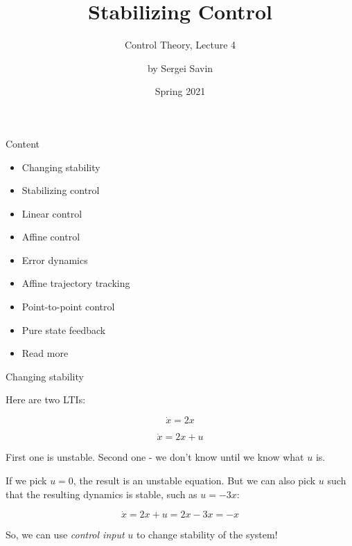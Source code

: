 \documentclass{beamer}
\title{Stabilizing Control}
\subtitle{Control Theory, Lecture 4}
\author{by Sergei Savin}
\date{Spring 2021}
\begin{document}
\maketitle


\begin{frame}{Content}

\begin{itemize}
\item Changing stability
\item Stabilizing control
\item Linear control
\item Affine control
\item Error dynamics
\item Affine trajectory tracking
\item Point-to-point control
\item Pure state feedback
\item Read more
\end{itemize}

\end{frame}



\begin{frame}{Changing stability}
\begin{flushleft}

Here are two LTIs:

\begin{equation}
    \dot{x} = 2 x
\end{equation}

\begin{equation}
    \dot{x} = 2 x + u
\end{equation}

First one is unstable. Second one - we don't know until we know what $u$ is.

\bigskip

If we pick $u=0$, the result is an unstable equation. But we can also pick $u$ such that the resulting dynamics is stable, such as $u=-3x$:

\begin{equation}
    \dot{x} = 2 x + u = 2 x - 3x = -x
\end{equation}

\begin{block}{ }
So, we can use \emph{control input} $u$ to change stability of the system!
\end{block}


\end{flushleft}
\end{frame}
\end{document}
